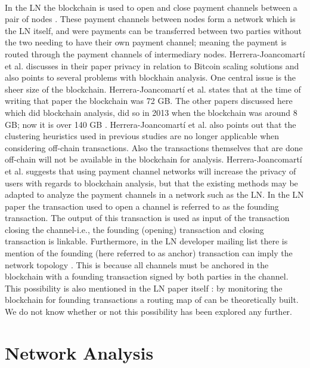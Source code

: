 \paragraph{}
In the LN the blockchain is used to open and close payment channels between a pair of nodes \cite{poon2015bitcoin} \cite{malavolta2017concurrency}. These payment channels between nodes form a network which is the LN itself, and were payments can be transferred between two parties without the two needing to have their own payment channel; meaning the payment is routed through the payment channels of intermediary nodes.
Herrera-Joancomartí et al. discusses in their paper \cite{herrera2016privacy} privacy in relation to Bitcoin scaling solutions and also points to several problems with blockhain analysis. One central issue is the sheer size of the blockchain. Herrera-Joancomartí et al. states that at the time of writing that paper the blockchain was 72 GB. The other papers discussed here which did blockchain analysis, did so in 2013 when the blockchain was around 8 GB; now it is over 140 GB \cite{blockchain_size}. 
Herrera-Joancomartí et al. also points out that the clustering heuristics used in previous studies \cite{reid2013analysis}  \cite{meiklejohn2013fistful} are no longer applicable when considering off-chain transactions. Also the transactions themselves that are done off-chain will not be available in the blockchain for analysis. Herrera-Joancomartí et al. suggests that using payment channel networks will increase the privacy of users with regards to blockchain analysis, but that the existing methods may be adapted to analyze the payment channels in a network such as the LN. In the LN paper \cite{poon2015bitcoin} the transaction used to open a channel is referred to as the founding transaction. The output of this transaction is used as input of the transaction closing the channel-i.e., the founding (opening) transaction and closing transaction is linkable. Furthermore, in the LN developer mailing list there is mention of the founding (here referred to as anchor) transaction can imply the network topology \cite{rusty_routing1}. This is because all channels must be anchored in the blockchain with a founding transaction signed by both parties in the channel. This possibility is also mentioned in the LN paper itself \cite{poon2015bitcoin}: by monitoring the blockchain for founding transactions a routing map of can be theoretically built. We do not know whether or not this possibility has been explored any further.

\section{Network Analysis}

